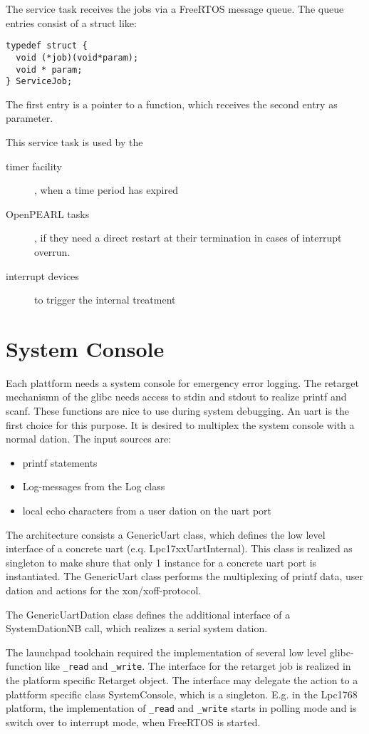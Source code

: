 The service task receives the jobs via a FreeRTOS message queue. 
The queue entries consist of a struct like:
\begin{verbatim}
typedef struct { 
  void (*job)(void*param);
  void * param;
} ServiceJob;
\end{verbatim}
The first entry is a pointer to a function, which receives the second entry
as parameter.

This service task is used by the
\begin{description}
\item[timer facility], when a time period has expired
\item[OpenPEARL tasks], if they need a direct restart at their
     termination in cases of interrupt overrun.
\item[interrupt devices] to trigger the internal treatment
\end{description}

\section{System Console}
Each plattform needs a system console for emergency error logging.
The retarget mechanismn of the glibc needs access to stdin and stdout
to realize printf and scanf. These functions are nice to use during 
system debugging.
An uart is the first choice for this purpose. It is desired to multiplex
the system console with a normal dation. The input sources are:
\begin{itemize}
\item printf statements
\item Log-messages from the Log class
\item local echo characters from a user dation on the uart port
\end{itemize}

The  architecture consists a GenericUart class, which defines the low 
level interface 
of a concrete uart (e.q. Lpc17xxUartInternal). This class is
realized as singleton to make shure that only 1 instance for a 
concrete uart port is instantiated.
The GenericUart class performs the multiplexing of printf data,
user dation and actions for the xon/xoff-protocol.

The GenericUartDation class defines the additional interface of a
SystemDationNB call, which realizes a serial system dation. 

The launchpad toolchain required the implementation of several
low level glibc-function like  \verb|_read| and \verb|_write|.
The interface for the retarget job is realized in the platform specific Retarget object.
The interface may delegate the action  to a plattform specific class SystemConsole, which
is a singleton. 
E.g. in the Lpc1768 platform, the implementation of \verb|_read| and 
\verb|_write| starts in polling mode
and is switch over to interrupt mode, when FreeRTOS is started.

